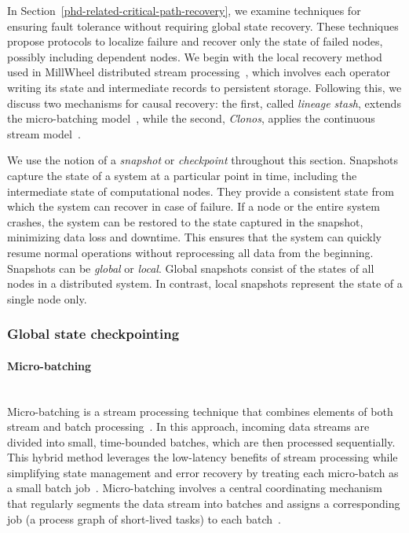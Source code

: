 In Section~\ref{phd-related-critical-path-recovery}, we examine techniques for ensuring fault tolerance without requiring global state recovery. These techniques propose protocols to localize failure and recover only the state of failed nodes, possibly including dependent nodes. We begin with the local recovery method used in MillWheel distributed stream processing~\cite{Akidau:2013:MFS:2536222.2536229}, which involves each operator writing its state and intermediate records to persistent storage. Following this, we discuss two mechanisms for causal recovery: the first, called {\em lineage stash}, extends the micro-batching model~\cite{Wang:2019:LSF:3341301.3359653}, while the second, {\em Clonos}, applies the continuous stream model~\cite{silvestre2021clonos}.

We use the notion of a {\em snapshot} or {\em checkpoint} throughout this section. Snapshots capture the state of a system at a particular point in time, including the intermediate state of computational nodes. They provide a consistent state from which the system can recover in case of failure. If a node or the entire system crashes, the system can be restored to the state captured in the snapshot, minimizing data loss and downtime. This ensures that the system can quickly resume normal operations without reprocessing all data from the beginning. Snapshots can be {\em global} or {\em local}. Global snapshots consist of the states of all nodes in a distributed system. In contrast, local snapshots represent the state of a single node only.

\subsubsection{Global state checkpointing}
\label{phd-related-global-state-checkpointing}

\paragraph{Micro-batching} \mbox{} \\

Micro-batching is a stream processing technique that combines elements of both stream and batch processing~\cite{Zaharia:2012:DSE:2342763.2342773, zaharia2010spark}. In this approach, incoming data streams are divided into small, time-bounded batches, which are then processed sequentially. This hybrid method leverages the low-latency benefits of stream processing while simplifying state management and error recovery by treating each micro-batch as a small batch job~\cite{garcia2023micro}. Micro-batching involves a central coordinating mechanism that regularly segments the data stream into batches and assigns a corresponding job (a process graph of short-lived tasks) to each batch~\cite{Zaharia:2012:DSE:2342763.2342773}.

